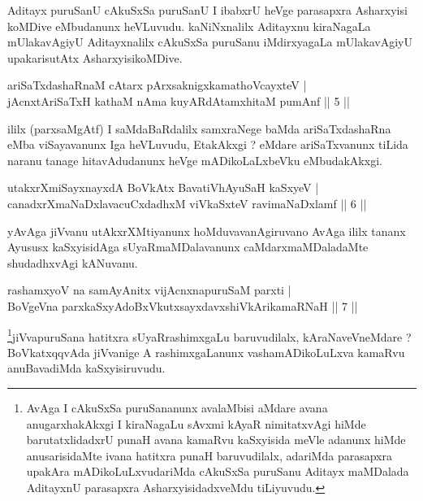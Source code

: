\begin{artha}
Aditayx puruSanU cAkuSxSa puruSanU I ibabxrU heVge parasapxra Asharxyisi koMDive eMbudanunx heVLuvudu. kaNiNxnalilx Aditayxnu kiraNagaLa mUlakavAgiyU Aditayxnalilx cAkuSxSa puruSanu iMdirxyagaLa mUlakavAgiyU upakarisutAtx AsharxyisikoMDive.
\end{artha}

\begin{shl}
ariSaTxdashaRnaM cAtarx pArxsaknigxkamathoVcayxteV | \\
jAcnxtAriSaTxH kathaM nAma kuyARdAtamxhitaM pumAnf \hfill ||  5 || 
\end{shl}

\begin{artha}
ililx (parxsaMgAtf) I saMdaBaRdalilx samxraNege baMda ariSaTxdashaRna eMba viSayavanunx Iga heVLuvudu, EtakAkxgi ? eMdare ariSaTxvanunx tiLida naranu tanage hitavAdudanunx heVge mADikoLaLxbeVku eMbudakAkxgi.
\end{artha}

\begin{shl}
\footnotemark{}utakxrXmiSayxnayxdA BoVkAtx BavatiVhA\s \s yuSaH kaSxyeV | \\
canadxrXmaNaDxlavacuCxdadhxM viVkaSxteV ravimaNaDxlamf \hfill ||  6 || 
\end{shl}

\begin{artha}
yAvAga jiVvanu utAkxrXMtiyanunx hoMduvavanAgiruvano AvAga ililx tananx Ayususx kaSxyisidAga sUyaRmaMDalavanunx caMdarxmaMDaladaMte shudadhxvAgi kANuvanu.
\end{artha}


\begin{shl}
rashamxyoV na samAyAnitx vijAcnxnapuruSaM parxti | \\
BoVgeVna parxkaSxyAdoBxVkutxsayxdavxshiVkArikamaRNaH \hfill ||  7 || 
\end{shl}

\begin{artha}
\footnote{AvAga I cAkuSxSa puruSananunx avalaMbisi aMdare avana anugarxhakAkxgi I kiraNagaLu sAvxmi kAyaR nimitatxvAgi hiMde barutatxlidadxrU punaH avana kamaRvu kaSxyisida meVle adanunx hiMde anusarisidaMte ivana hatitxra punaH baruvudilalx, adariMda parasapxra upakAra mADikoLuLxvudariMda cAkuSxSa puruSanu Aditayx maMDalada AditayxnU parasapxra AsharxyisidadxveMdu tiLiyuvudu.}jiVvapuruSana hatitxra sUyaRrashimxgaLu baruvudilalx, kAraNaveVneMdare ? BoVkatxqqvAda jiVvanige A rashimxgaLanunx vashamADikoLuLxva kamaRvu anuBavadiMda kaSxyisiruvudu.
\end{artha}

